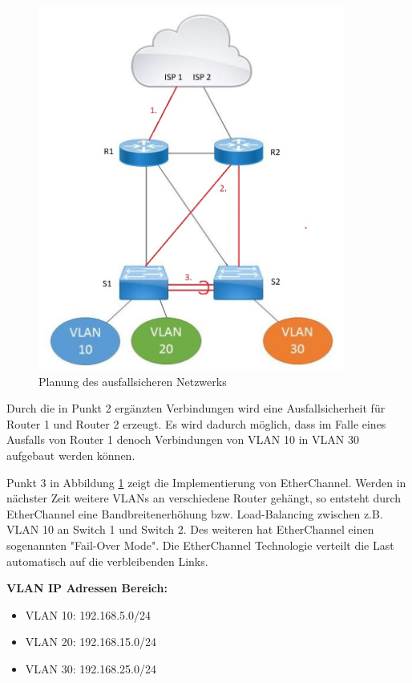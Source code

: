 \begin{figure}[H]
	\centering
	\includegraphics[width=0.9\textwidth]{img/Planung_neu.JPG}
	\caption{Planung des ausfallsicheren Netzwerks}
	\label{img:Netzwerkplanung}
\end{figure}

Durch die in Punkt 2 ergänzten Verbindungen wird eine Ausfallsicherheit für Router 1 und Router 2 erzeugt. Es wird dadurch möglich, dass im Falle eines Ausfalls von Router 1 denoch Verbindungen von \ac{VLAN} 10 in \ac{VLAN} 30 aufgebaut werden können.

Punkt 3 in Abbildung \ref{img:Netzwerkplanung} zeigt die Implementierung von EtherChannel. Werden in nächster Zeit weitere \ac{VLAN}s an verschiedene Router gehängt, so entsteht durch EtherChannel eine Bandbreitenerhöhung bzw. Load-Balancing zwischen z.B. \ac{VLAN} 10 an Switch 1 und Switch 2. Des weiteren hat EtherChannel einen sogenannten "Fail-Over Mode". Die EtherChannel Technologie verteilt die Last automatisch auf die verbleibenden Links.

\textbf{\ac{VLAN} \ac{IP} Adressen Bereich:} 

\begin{itemize}  
\item VLAN 10: 192.168.5.0/24
\item VLAN 20: 192.168.15.0/24
\item VLAN 30: 192.168.25.0/24
\end{itemize}

